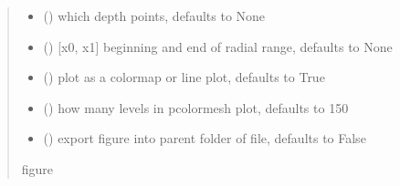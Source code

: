 \documentclass[letterpaper,10pt,english]{sphinxmanual}
\begin{document}
\begin{fulllineitems}
\begin{fulllineitems}
\begin{quote}
\begin{description}
\begin{itemize}
\item {} 
\sphinxAtStartPar
{} (\sphinxstyleliteralemphasis{\sphinxupquote{, }}) \textendash{} which depth points, defaults to None

\item {} 
\sphinxAtStartPar
{} (\sphinxstyleliteralemphasis{\sphinxupquote{, }}) \textendash{} {[}x0, x1{]} beginning and end of radial range, defaults to None

\item {} 
\sphinxAtStartPar
{} (\sphinxstyleliteralemphasis{\sphinxupquote{, }}) \textendash{} plot as a colormap or line plot, defaults to True

\item {} 
\sphinxAtStartPar
{} (\sphinxstyleliteralemphasis{\sphinxupquote{, }}) \textendash{} how many levels in pcolormesh plot, defaults to 150

\item {} 
\sphinxAtStartPar
{} (\sphinxstyleliteralemphasis{\sphinxupquote{, }}) \textendash{} export figure into parent folder of file, defaults to False

\end{itemize}

\sphinxAtStartPar
figure

\end{description}\end{quote}

\end{fulllineitems}


\end{fulllineitems}

\end{document}
